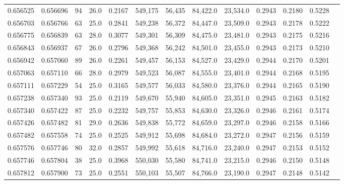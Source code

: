\begin{tabular}{rrrrrrrrrrrrr}
0.656525 & 0.656696 &    94 & 26.0 &                                     0.2167 & 549,175 &  56,435 &  84,422.0 &  23,534.0 & 0.2943 & 0.2180 & 0.5228 \\
0.656703 & 0.656766 &    63 & 25.0 &                                     0.2841 & 549,238 &  56,372 &  84,447.0 &  23,509.0 & 0.2943 & 0.2178 & 0.5222 \\
0.656775 & 0.656839 &    63 & 28.0 &                                     0.3077 & 549,301 &  56,309 &  84,475.0 &  23,481.0 & 0.2943 & 0.2175 & 0.5216 \\
0.656843 & 0.656937 &    67 & 26.0 &                                     0.2796 & 549,368 &  56,242 &  84,501.0 &  23,455.0 & 0.2943 & 0.2173 & 0.5210 \\
0.656942 & 0.657060 &    89 & 26.0 &                                     0.2261 & 549,457 &  56,153 &  84,527.0 &  23,429.0 & 0.2944 & 0.2170 & 0.5201 \\
0.657063 & 0.657110 &    66 & 28.0 &                                     0.2979 & 549,523 &  56,087 &  84,555.0 &  23,401.0 & 0.2944 & 0.2168 & 0.5195 \\
0.657111 & 0.657229 &    54 & 25.0 &                                     0.3165 & 549,577 &  56,033 &  84,580.0 &  23,376.0 & 0.2944 & 0.2165 & 0.5190 \\
0.657238 & 0.657340 &    93 & 25.0 &                                     0.2119 & 549,670 &  55,940 &  84,605.0 &  23,351.0 & 0.2945 & 0.2163 & 0.5182 \\
0.657340 & 0.657422 &    87 & 25.0 &                                     0.2232 & 549,757 &  55,853 &  84,630.0 &  23,326.0 & 0.2946 & 0.2161 & 0.5174 \\
0.657426 & 0.657482 &    81 & 29.0 &                                     0.2636 & 549,838 &  55,772 &  84,659.0 &  23,297.0 & 0.2946 & 0.2158 & 0.5166 \\
0.657482 & 0.657558 &    74 & 25.0 &                                     0.2525 & 549,912 &  55,698 &  84,684.0 &  23,272.0 & 0.2947 & 0.2156 & 0.5159 \\
0.657576 & 0.657746 &    80 & 32.0 &                                     0.2857 & 549,992 &  55,618 &  84,716.0 &  23,240.0 & 0.2947 & 0.2153 & 0.5152 \\
0.657746 & 0.657804 &    38 & 25.0 &                                     0.3968 & 550,030 &  55,580 &  84,741.0 &  23,215.0 & 0.2946 & 0.2150 & 0.5148 \\
0.657812 & 0.657900 &    73 & 25.0 &                                     0.2551 & 550,103 &  55,507 &  84,766.0 &  23,190.0 & 0.2947 & 0.2148 & 0.5142 \\

\end{tabular}
